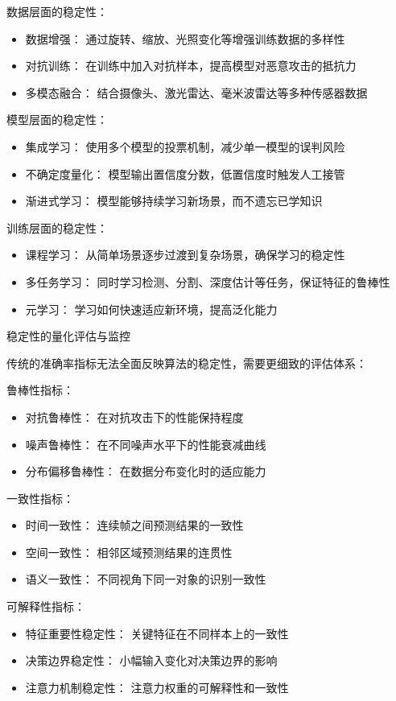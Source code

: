数据层面的稳定性：
\begin{itemize}
\item 数据增强： 通过旋转、缩放、光照变化等增强训练数据的多样性
\item 对抗训练： 在训练中加入对抗样本，提高模型对恶意攻击的抵抗力
\item 多模态融合： 结合摄像头、激光雷达、毫米波雷达等多种传感器数据
\end{itemize}

模型层面的稳定性：
\begin{itemize}
\item 集成学习： 使用多个模型的投票机制，减少单一模型的误判风险
\item 不确定度量化： 模型输出置信度分数，低置信度时触发人工接管
\item 渐进式学习： 模型能够持续学习新场景，而不遗忘已学知识
\end{itemize}

训练层面的稳定性：
\begin{itemize}
\item 课程学习： 从简单场景逐步过渡到复杂场景，确保学习的稳定性
\item 多任务学习： 同时学习检测、分割、深度估计等任务，保证特征的鲁棒性
\item 元学习： 学习如何快速适应新环境，提高泛化能力
\end{itemize}

稳定性的量化评估与监控

传统的准确率指标无法全面反映算法的稳定性，需要更细致的评估体系：

鲁棒性指标：
\begin{itemize}
\item 对抗鲁棒性： 在对抗攻击下的性能保持程度
\item 噪声鲁棒性： 在不同噪声水平下的性能衰减曲线
\item 分布偏移鲁棒性： 在数据分布变化时的适应能力
\end{itemize}

一致性指标：
\begin{itemize}
\item 时间一致性： 连续帧之间预测结果的一致性
\item 空间一致性： 相邻区域预测结果的连贯性
\item 语义一致性： 不同视角下同一对象的识别一致性
\end{itemize}

可解释性指标：
\begin{itemize}
\item 特征重要性稳定性： 关键特征在不同样本上的一致性
\item 决策边界稳定性： 小幅输入变化对决策边界的影响
\item 注意力机制稳定性： 注意力权重的可解释性和一致性
\end{itemize}

